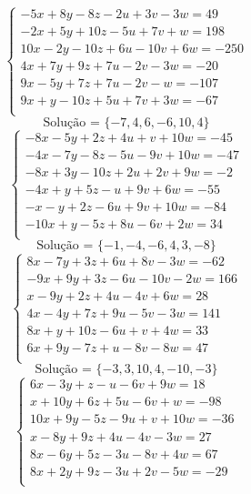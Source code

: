 \documentclass[12pt,oneside,a4paper]{article}
\begin{document}
\vspace{\baselineskip}
\begin{equation*}
\begin{cases}
-5x+8y-8z-2u+3v-3w=49 \\
-2x+5y+10z-5u+7v+w=198 \\
10x-2y-10z+6u-10v+6w=-250 \\
4x+7y+9z+7u-2v-3w=-20 \\
9x-5y+7z+7u-2v-w=-107 \\
9x+y-10z+5u+7v+3w=-67 \\
\end{cases}
\end{equation*}
\begin{equation*}
\text{Solução = }\{-7,4,6,-6,10,4\}
\end{equation*}
\vspace{\baselineskip}
\begin{equation*}
\begin{cases}
-8x-5y+2z+4u+v+10w=-45 \\
-4x-7y-8z-5u-9v+10w=-47 \\
-8x+3y-10z+2u+2v+9w=-2 \\
-4x+y+5z-u+9v+6w=-55 \\
-x-y+2z-6u+9v+10w=-84 \\
-10x+y-5z+8u-6v+2w=34 \\
\end{cases}
\end{equation*}
\begin{equation*}
\text{Solução = }\{-1,-4,-6,4,3,-8\}
\end{equation*}
\vspace{\baselineskip}
\begin{equation*}
\begin{cases}
8x-7y+3z+6u+8v-3w=-62 \\
-9x+9y+3z-6u-10v-2w=166 \\
x-9y+2z+4u-4v+6w=28 \\
4x-4y+7z+9u-5v-3w=141 \\
8x+y+10z-6u+v+4w=33 \\
6x+9y-7z+u-8v-8w=47 \\
\end{cases}
\end{equation*}
\begin{equation*}
\text{Solução = }\{-3,3,10,4,-10,-3\}
\end{equation*}
\vspace{\baselineskip}
\begin{equation*}
\begin{cases}
6x-3y+z-u-6v+9w=18 \\
x+10y+6z+5u-6v+w=-98 \\
10x+9y-5z-9u+v+10w=-36 \\
x-8y+9z+4u-4v-3w=27 \\
8x-6y+5z-3u-8v+4w=67 \\
8x+2y+9z-3u+2v-5w=-29 \\
\end{cases}
\end{equation*}
\end{document}
